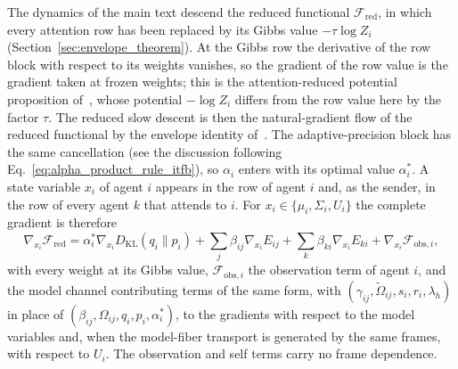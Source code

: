 \documentclass[11pt]{article}
\begin{document}
The dynamics of the main text descend the reduced functional $\mathcal{F}_{\mathrm{red}}$, in which every attention row has been replaced by its Gibbs value $-\tau\log Z_i$ (Section~\ref{sec:envelope_theorem}). At the Gibbs row the derivative of the row block with respect to its weights vanishes, so the gradient of the row value is the gradient taken at frozen weights; this is the attention-reduced potential proposition of~\cite[Ch.~6]{DennisGaugeVFE2026}, whose potential $-\log Z_i$ differs from the row value here by the factor $\tau$. The reduced slow descent is then the natural-gradient flow of the reduced functional by the envelope identity of~\cite[Ch.~8]{DennisGaugeVFE2026}. The adaptive-precision block has the same cancellation (see the discussion following Eq.~\eqref{eq:alpha_product_rule_itfb}), so $\alpha_i$ enters with its optimal value $\alpha_i^*$. A state variable $x_i$ of agent $i$ appears in the row of agent $i$ and, as the sender, in the row of every agent $k$ that attends to $i$. For $x_i \in \{\mu_i, \Sigma_i, U_i\}$ the complete gradient is therefore
\begin{equation}
\nabla_{x_i}\mathcal{F}_{\mathrm{red}} = \alpha_i^*\nabla_{x_i}D_{\mathrm{KL}}(q_i \| p_i) + \sum_j \beta_{ij}\nabla_{x_i}E_{ij} + \sum_k \beta_{ki}\nabla_{x_i}E_{ki} + \nabla_{x_i}\mathcal{F}_{\mathrm{obs},i},
\label{eq:canonical_gradient_general}
\end{equation}
with every weight at its Gibbs value, $\mathcal{F}_{\mathrm{obs},i}$ the observation term of agent $i$, and the model channel contributing terms of the same form, with $(\gamma_{ij}, \tilde\Omega_{ij}, s_i, r_i, \lambda_h)$ in place of $(\beta_{ij}, \Omega_{ij}, q_i, p_i, \alpha_i^*)$, to the gradients with respect to the model variables and, when the model-fiber transport is generated by the same frames, with respect to $U_i$. The observation and self terms carry no frame dependence.
\end{document}
